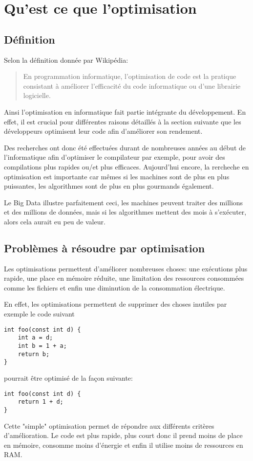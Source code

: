 \section{Qu'est ce que l'optimisation}
\subsection{Définition}
Selon la définition donnée par Wikipédia:
\begin{quote}
    En programmation informatique, l'optimisation de code est la pratique consistant à améliorer l'efficacité du code informatique ou d'une librairie logicielle. \cite{wiki:Optimisation_de_code}
\end{quote}
Ainsi l'optimisation en informatique fait partie intégrante du développement. En effet, il est crucial pour différentes raisons détaillés à la section suivante que les développeurs optimisent leur code afin d'améliorer son rendement.

Des recherches ont donc été effectuées durant de nombreuses années au début de l'informatique afin d'optimiser le compilateur par exemple, pour avoir des compilations plus rapides ou/et plus efficaces. Aujourd'hui encore, la rercheche en optimisation est importante car mêmes si les machines sont de plus en plus puissantes, les algorithmes sont de plus en plus gourmands également.

Le Big Data illustre parfaitement ceci, les machines peuvent traiter des millions et des millions de données, mais si les algorithmes mettent des mois à s'exécuter, alors cela aurait eu peu de valeur.

\subsection{Problèmes à résoudre par optimisation}
Les optimisations permettent d'améliorer nombreuses choses: une exécutions plus rapide, une place en mémoire réduite, une limitation des ressources consommées comme les fichiers et enfin une diminution de la consommation électrique.

En effet, les optimisations permettent de supprimer des choses inutiles par exemple le code suivant
\begin{center}
\begin{lstlisting}[xleftmargin=.35\textwidth]
int foo(const int d) {
    int a = d;
    int b = 1 + a;
    return b;
}
\end{lstlisting}
\end{center}
pourrait être optimisé de la façon suivante:
\begin{lstlisting}[xleftmargin=.35\textwidth]
int foo(const int d) {
    return 1 + d;
}
\end{lstlisting}
Cette "simple" optimisation permet de répondre aux différents critères d'amélioration. Le code est plus rapide, plus court donc il prend moins de place en mémoire, consomme moins d'énergie et enfin il utilise moins de ressources en RAM.

